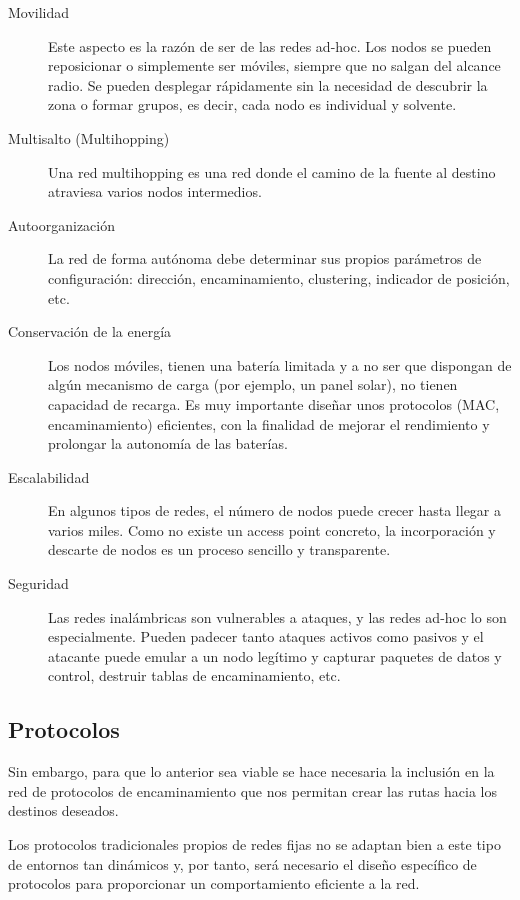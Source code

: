 \begin{description}

\item[Movilidad]
Este aspecto es la raz\'on de ser de las redes ad-hoc. Los nodos se pueden reposicionar o simplemente ser m\'oviles, siempre que no salgan del alcance radio. Se pueden desplegar r\'apidamente sin la necesidad de descubrir la zona o formar grupos, es decir, cada nodo es individual y solvente. 

\item[Multisalto (Multihopping)]
Una red multihopping es una red donde el camino de la fuente al destino atraviesa varios nodos intermedios. 

\item[Autoorganizaci\'on]
La red de forma aut\'onoma debe determinar sus propios par\'ametros de configuraci\'on: direcci\'on, encaminamiento, clustering, indicador de posici\'on, etc. 

\item[Conservaci\'on de la energ\'ia] 
Los nodos m\'oviles, tienen una bater\'ia limitada y a no ser que dispongan de alg\'un mecanismo de carga (por ejemplo, un panel solar), no tienen capacidad de recarga. Es muy importante dise\~nar unos protocolos (MAC, encaminamiento) eficientes, con la finalidad de mejorar el rendimiento y prolongar la autonom\'ia de las bater\'ias. 

\item[Escalabilidad]
En algunos tipos de redes, el n\'umero de nodos puede crecer hasta llegar a varios miles. Como no existe un access point concreto, la incorporaci\'on y descarte de nodos es un proceso sencillo y transparente. 

\item[Seguridad]
Las redes inal\'ambricas son vulnerables a ataques, y las redes ad-hoc lo son especialmente. Pueden padecer tanto ataques activos como pasivos y el atacante puede emular a un nodo leg\'itimo y capturar paquetes de datos y control, destruir tablas de encaminamiento, etc.
\end{description}

\subsection{Protocolos}
Sin embargo, para que lo anterior sea viable se hace necesaria la inclusi\'on en la red de protocolos de encaminamiento que nos permitan crear las rutas hacia los destinos deseados. 

Los protocolos tradicionales propios de redes fijas no se adaptan bien a este tipo de entornos tan din\'amicos y, por tanto, ser\'a necesario el dise\~no espec\'ifico de protocolos para proporcionar un comportamiento eficiente a la red. 


